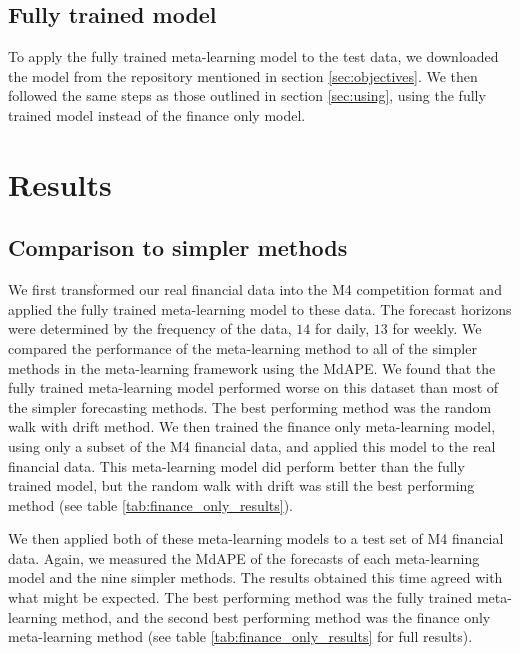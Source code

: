 \documentclass[a4paper,12pt]{article}
\theoremstyle{definition}
\begin{document}
\subsection{Fully trained model}
To apply the fully trained meta-learning model to the test data, we downloaded the model from the repository mentioned in section \ref{sec:objectives}. We then followed the same steps as those outlined in section \ref{sec:using}, using the fully trained model instead of the finance only model.

\section{Results}

\subsection{Comparison to simpler methods}
We first transformed our real financial data into the M4 competition format and applied the fully trained meta-learning model to these data. The forecast horizons were determined by the frequency of the data, $14$ for daily, $13$ for weekly. We compared the performance of the meta-learning method to all of the simpler methods in the meta-learning framework using the MdAPE. We found that the fully trained meta-learning model performed worse on this dataset than most of the simpler forecasting methods. The best performing method was the random walk with drift method. We then trained the finance only meta-learning model, using only a subset of the M4 financial data, and applied this model to the real financial data. This meta-learning model did perform better than the fully trained model, but the random walk with drift was still the best performing method (see table \ref{tab:finance_only_results}).

We then applied both of these meta-learning models to a test set of M4 financial data. Again, we measured the MdAPE of the forecasts of each meta-learning model and the nine simpler methods. The results obtained this time agreed with what might be expected. The best performing method was the fully trained meta-learning method, and the second best performing method was the finance only meta-learning method (see table \ref{tab:finance_only_results} for full results).
\end{document}
